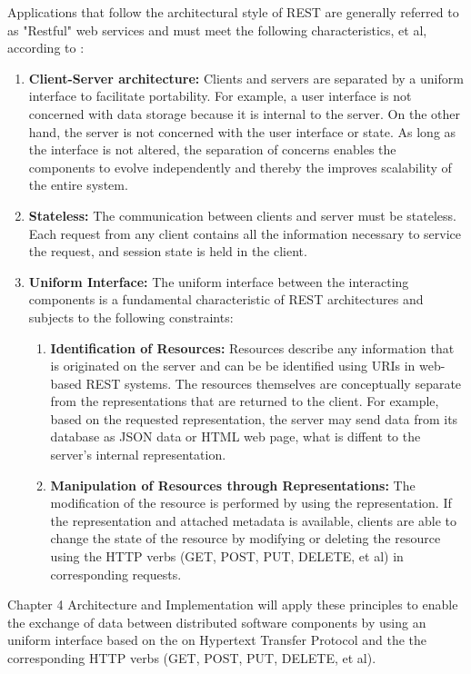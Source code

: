 Applications that follow the architectural style of REST are generally referred to as "Restful" web services and must meet
the following characteristics, et al, according to \cite{Field00}:
\begin{enumerate}
    \item \textbf{Client-Server architecture:}
    Clients and servers are separated by a uniform interface to facilitate portability. For example, a user interface
    is not concerned with data storage because it is internal to the server. On the other hand, the server is not concerned
    with the user interface or state. As long as the interface is not altered, the separation of concerns enables the
    components to evolve independently and thereby the improves scalability of the entire system.
    \item \textbf{Stateless:}
    The communication between clients and server must be stateless. Each request from any client contains all the
    information necessary to service the request, and session state is held in the client.
    \item \textbf{Uniform Interface:}
    The uniform interface between the interacting components is a fundamental characteristic of REST architectures and subjects
    to the following constraints:
    \begin{enumerate}
        \item \textbf{Identification of Resources:}
        Resources describe any information that is originated on the server and can be be identified using URIs in web-based
        REST systems. The resources themselves are conceptually separate from the representations that are returned to the client.
        For example, based on the requested representation, the server may send data from its database as JSON data or HTML web
        page, what is diffent to the server's internal representation.
        \item \textbf{Manipulation of Resources through Representations:}
        The modification of the resource is performed by using the representation. If the representation and attached metadata
        is available, clients are able to change the state of the resource by modifying or deleting the resource using the
        HTTP verbs (GET, POST, PUT, DELETE, et al) in corresponding requests.
    \end{enumerate}
\end{enumerate}

Chapter 4 Architecture and Implementation will apply these principles to enable the exchange of data between distributed
software components by using an uniform interface based on the on Hypertext Transfer Protocol and the the corresponding HTTP
verbs (GET, POST, PUT, DELETE, et al).

